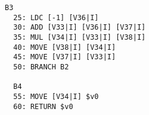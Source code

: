 \documentclass[8pt,a4paper,compress]{beamer}
\begin{document}
\begin{frame}[fragile]
\begin{lstlisting}[language={}]
  B3                                                                                                                                                                                                                                          
  25: LDC [-1] [V36|I]                                                                                                                                                                                                                        
  30: ADD [V33|I] [V36|I] [V37|I]                                                                                                                                                                                                             
  35: MUL [V34|I] [V33|I] [V38|I]                                                                                                                                                                                                             
  40: MOVE [V38|I] [V34|I]                                                                                                                                                                                                                    
  45: MOVE [V37|I] [V33|I]                                                                                                                                                                                                                    
  50: BRANCH B2                                                                                                                                                                                                                               
                                                                                                                                                                                                                                              
  B4                                                                                                                                                                                                                                          
  55: MOVE [V34|I] $v0
  60: RETURN $v0
\end{lstlisting}
\end{frame}
\end{document}
